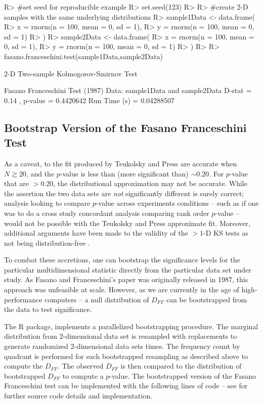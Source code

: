 \documentclass[codesnippet]{jss}
\newcommand{\fct}[1]{\code{#1()}}
\begin{document}
\begin{CodeChunk}
\begin{CodeInput}
R> #set seed for reproducible example
R> set.seed(123)
R>
R> #create 2-D samples with the same underlying distributions
R> sample1Data <- data.frame(
R>  x = rnorm(n = 100, mean = 0, sd = 1),
R>  y = rnorm(n = 100, mean = 0, sd = 1)
R> )
R> sample2Data <- data.frame(
R>  x = rnorm(n = 100, mean = 0, sd = 1),
R>  y = rnorm(n = 100, mean = 0, sd = 1)
R> )
R>
R> fasano.franceschini.test(sample1Data,sample2Data)
\end{CodeInput}
\begin{CodeOutput}
      2-D Two-sample Kolmogorov-Smirnov Test

 Fasano Franceschini Test (1987)
 Data:  sample1Data and sample2Data
 D-stat =  0.14 , p-value =  0.4420642
 Run Time (s) =  0.04288507
\end{CodeOutput}
\end{CodeChunk}

\subsection{Bootstrap Version of the Fasano Franceschini Test}

As a caveat, to the fit produced by Teukolsky and Press are accurate when $N \gtrsim 20$, and the $p$-value is less than (more significant than) $\sim 0.20$. For $p$-value that are $> 0.20$, the distributional approximation may not be accurate. While the assertion the two data sets are \textit{not} significantly different is surely correct; analysis looking to compare $p$-value across experiments conditions -- such as if one was to do a cross study concordant analysis comparing rank order $p$-value \cite{Ness}
-- would not be possible with the Teukolsky and Press approximate fit. Moreover, additional arguments have been made to the validity of the $>1$-D KS tests as not being distribution-free \citep{Babu2006}.

To combat these accretions, one can bootstrap the significance levels for the particular multidimensional statistic directly from the particular data set under study. As Fasano and Franceschini's paper was originally released in 1987, this approach was unfeasible at scale. However, as we are currently in the age of high-performance computers -- a null distribution of $D_{FF}$ can be bootstrapped from the data to test significance.

The  R package, implements a parallelized bootstrapping procedure. The marginal distribution from 2-dimensional data set is resampled with replacements to generate randomized 2-dimensional data sets  times. The frequency count by quadrant is performed for each bootstrapped resampling as described above to compute the $D_{FF}$. The observed $D_{FF}$ is then compared to the distribution of bootstrapped $D_{FF}$ to compute a $p$-value. The bootstrapped version of the Fasano Franceschini test can be implemented with the following lines of code -- see \fct{fasano.franceschini.test} for further source code details and implementation.
\end{document}
